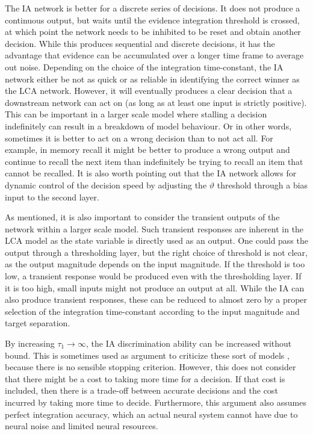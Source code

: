 The IA network is better for a discrete series of decisions.
It does not produce a continuous output, but waits until the evidence integration threshold is crossed, at which point the network needs to be inhibited to be reset and obtain another decision.
While this produces sequential and discrete decisions, it has the advantage that evidence can be accumulated over a longer time frame to average out noise.
Depending on the choice of the integration time-constant, the IA network either be not as quick or as reliable in identifying the correct winner as the LCA network.
However, it will eventually produces a clear decision that a downstream network can act on (as long as at least one input is strictly positive).
This can be important in a larger scale model where stalling a decision indefinitely can result in a breakdown of model behaviour.
Or in other words, sometimes it is better to act on a wrong decision than to not act all.
For example, in memory recall it might be better to produce a wrong output and continue to recall the next item than indefinitely be trying to recall an item that cannot be recalled.
It is also worth pointing out that the IA network allows for dynamic control of the decision speed by adjusting the $\vartheta$ threshold through a bias input to the second layer.

As mentioned, it is also important to consider the transient outputs of the network within a larger scale model.
Such transient responses are inherent in the LCA model as the state variable is directly used as an output.
One could pass the output through a thresholding layer, but the right choice of threshold is not clear, as the output magnitude depends on the input magnitude.
If the threshold is too low, a transient response would be produced even with the thresholding layer.
If it is too high, small inputs might not produce an output at all.
While the IA can also produce transient responses, these can be reduced to almost zero by a proper selection of the integration time-constant according to the input magnitude and target separation.

By increasing $\tau_1 \rightarrow \infty$, the IA discrimination ability can be increased without bound.
This is sometimes used as argument to criticize these sort of models \parencite[e.g.,][]{Usher2001}, because there is no sensible stopping criterion.
However, this does not consider that there might be a cost to taking more time for a decision.
If that cost is included, then there is a trade-off between accurate decisions and the cost incurred by taking more time to decide.
Furthermore, this argument also assumes perfect integration accuracy, which an actual neural system cannot have due to neural noise and limited neural resources.

